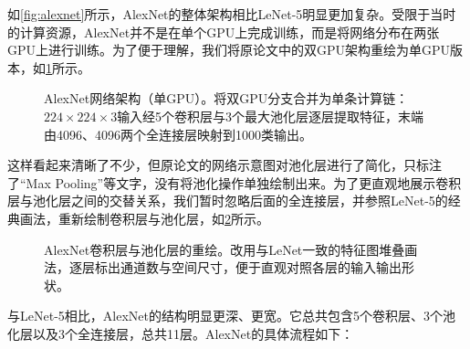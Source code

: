 如\cref{fig:alexnet}所示，AlexNet的整体架构相比LeNet-5明显更加复杂。受限于当时的计算资源，AlexNet并不是在单个GPU上完成训练，而是将网络分布在两张GPU上进行训练。为了便于理解，我们将原论文中的双GPU架构重绘为单GPU版本，如\cref{fig:alexnet_single_gpu}所示。

\begin{figure}[H]
    \caption{AlexNet网络架构（单GPU）。将双GPU分支合并为单条计算链：$224\times 224\times 3$输入经5个卷积层与3个最大池化层逐层提取特征，末端由4096、4096两个全连接层映射到1000类输出。}
    \label{fig:alexnet_single_gpu}
\end{figure}

这样看起来清晰了不少，但原论文的网络示意图对池化层进行了简化，只标注了“Max Pooling”等文字，没有将池化操作单独绘制出来。为了更直观地展示卷积层与池化层之间的交替关系，我们暂时忽略后面的全连接层，并参照LeNet-5的经典画法，重新绘制卷积层与池化层，如\cref{fig:alexnet_single}所示。

\begin{figure}[H]
    \caption{AlexNet卷积层与池化层的重绘。改用与LeNet一致的特征图堆叠画法，逐层标出通道数与空间尺寸，便于直观对照各层的输入输出形状。}
    \label{fig:alexnet_single}
\end{figure}

与LeNet-5相比，AlexNet的结构明显更深、更宽。它总共包含5个卷积层、3个池化层以及3个全连接层，总共11层。AlexNet的具体流程如下：


